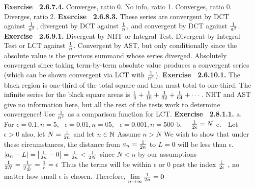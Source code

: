  {\noindent \protect \bf  Exercise ~2.6.7.4.} \textbullet Converges, ratio 0. \textbullet No info, ratio 1. \textbullet Converges, ratio 0. \textbullet Diverges, ratio 2. \protect \newline  \protect \newline  
 {\noindent \protect \bf  Exercise ~2.6.8.3.} These series are convergent by DCT against $\protect \frac  {1}{n^2}$, divergent by DCT against $\protect \frac  {1}{n}$, and convergent by DCT against $\protect \frac  {1}{n^2}$. \protect \newline  \protect \newline  
 {\noindent \protect \bf  Exercise ~2.6.9.1.} \textbullet Divergent by NHT or Integral Test. \textbullet Divergent by Integral Test or LCT against $\protect \frac  {1}{n}$. \textbullet Convergent by AST, but only conditionally since the absolute value is the previous summand whose series diverged. \textbullet Absolutely convergent since taking term-by-term absolute value produces a convergent series (which can be shown convergent via LCT with $\protect \frac  {1}{n^3}$). \protect \newline  \protect \newline  
 {\noindent \protect \bf  Exercise ~2.6.10.1.} The black region is one-third of the total square and thus must total to one-third. The infinite series for the black square areas is $\protect \frac  {1}{4}+\protect \frac  {1}{16}+\protect \frac  {1}{32}+\protect \frac  {1}{64}+\protect \cdots  $. NHT and AST give no information here, but all the rest of the tests work to determine convergence! Use $\protect \frac  {1}{n^2}$ as a comparison function for LCT. \protect \newline  \protect \newline  
 {\noindent \protect \bf  Exercise ~2.8.1.1.} a.~~ For $\epsilon = 0.1, n=5,~~~\epsilon = 0.01, n=05,~~~\epsilon = 0.001, n=500$ b.~~ $\protect \frac  {1}{2\epsilon }=N $ c.~~Let $ \epsilon >0$ also, let $N = \protect \frac  {1}{2n}$ and let $n \in \protect \mathbb  {N}$ Assume $n>N$ We wish to show that under these circumstances, the distance from $a_n= \protect \frac  {1}{2n}$ to $L=0$ will be less than $\epsilon $. $\left | a_n-L \right | =\left |\protect \frac  {1}{2n}-0 \right | = \protect \frac  {1}{2n} < \protect \frac  {1}{2N}$ since $N<n$ by our assumptions $ \protect \frac  {1}{2N }=\protect \frac  {1}{2\protect \frac  {1}{2 \epsilon }} = \protect \frac  {1}{\epsilon } = \epsilon $ Thus the terms will be within $\epsilon $ or 0 past the index $\protect \frac  {1}{2 \epsilon }$ , no matter how small $\epsilon $ is chosen. Therefore, $\protect \qopname  \relax m{lim}\limits _{n \to \infty }{\protect \frac  {1}{2n}} = 0$  \protect \newline  \protect \newline  
